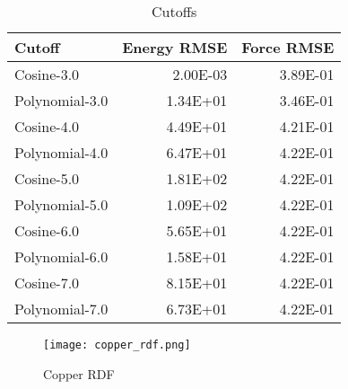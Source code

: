 \begin{table}
\begin{tabular}{lrr}
\toprule
         Cutoff &  Energy RMSE &  Force RMSE \\
\midrule
     Cosine-3.0 &     2.00E-03 &    3.89E-01 \\
 Polynomial-3.0 &     1.34E+01 &    3.46E-01 \\
     Cosine-4.0 &     4.49E+01 &    4.21E-01 \\
 Polynomial-4.0 &     6.47E+01 &    4.22E-01 \\
     Cosine-5.0 &     1.81E+02 &    4.22E-01 \\
 Polynomial-5.0 &     1.09E+02 &    4.22E-01 \\
     Cosine-6.0 &     5.65E+01 &    4.22E-01 \\
 Polynomial-6.0 &     1.58E+01 &    4.22E-01 \\
     Cosine-7.0 &     8.15E+01 &    4.22E-01 \\
 Polynomial-7.0 &     6.73E+01 &    4.22E-01 \\
\bottomrule
\end{tabular}
\caption{Cutoffs}
\label{table:cutoffs}
\end{table}

\begin{figure}
    \centering
    \texttt{[image: copper\_rdf.png]}
    \caption{Copper RDF}
    \label{fig:copper_rdf}
\end{figure}

